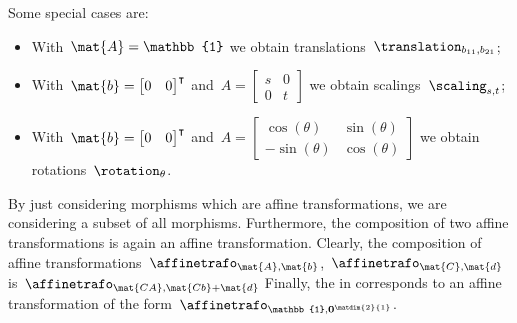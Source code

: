 \begin{solution}
\begin{itemize}
              Some special cases are:
              \begin{itemize}
                  \item With~$\mat{A}=\mathbb{1}$ we obtain translations~$\translation_{b_{11},b_{21}}$;
                  \item With~$\mat{b}=\begin{bmatrix}
                                0 & 0
                            \end{bmatrix}^\intercal$ and~$A=\begin{bmatrix}
                                s & 0 \\0& t
                            \end{bmatrix}$ we obtain scalings~$\scaling_{s,t}$;
                  \item With~$\mat{b}=\begin{bmatrix}
                                0 & 0
                            \end{bmatrix}^\intercal$ and~$A=\begin{bmatrix}
                                \cos(\theta) & \sin(\theta) \\-\sin(\theta)& \cos(\theta)
                            \end{bmatrix}$ we obtain rotations~$\rotation_{\theta}$.
              \end{itemize}
              By just considering morphisms which are affine transformations, we are considering a subset of all morphisms.
              Furthermore, the composition of two affine transformations is again an affine transformation.
              Clearly, the composition of affine transformations~$\affinetrafo_{\mat{A},\mat{b}}$,~$\affinetrafo_{\mat{C},\mat{d}}$ is~$\affinetrafo_{\mat{CA},\mat{Cb}+\mat{d}}$
              Finally, the  in \Draw corresponds to an affine transformation of the form~$\affinetrafo_{\mathbb{1},\mathbf{0}^{\matdim{2}{1}}}$.
    \end{itemize}
\end{solution}

